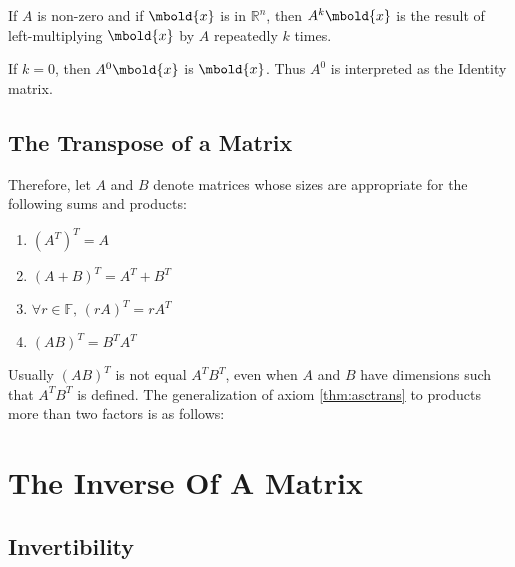 \documentclass[12pt letter]{report}
\begin{document}

If $A$ is non-zero and if $\mbold{x}$ is in $\mathbb{R}^{n}$, then $A^{k} \mbold{x}$ is the result of left-multiplying
$\mbold{x}$ by $A$ repeatedly $k$ times.

If $k = 0$, then $A^{0} \mbold{x}$ is $\mbold{x}$. Thus $A^{0}$ is interpreted as the Identity matrix.

\section{The Transpose of a Matrix}


Therefore, let $A$ and $B$ denote matrices whose sizes are appropriate for the following sums and products:
\begin{enumerate}
  \item $ \left( A^{T} \right)^{T} = A$
  \item $ \left( A + B \right)^{T} = A^{T} + B^{T} $
  \item $\forall r \in \mathbb{F}, \, \left( r A \right)^{T} = r A^{T}  $
  \item $ \left( A B \right)^{T} = B ^{T} A^{T} $ \label{thm:asctrans}
\end{enumerate}

Usually $ \left( A B \right)^{T} $ is not equal $A ^{T} B^{T}$, even when $A$ and $B$ have dimensions such that $A ^{T}
  B^{T}$ is defined. The generalization of axiom \ref{thm:asctrans} to products more than two factors is as follows:


\chapter{The Inverse Of A Matrix}

\section{Invertibility}
\end{document}

